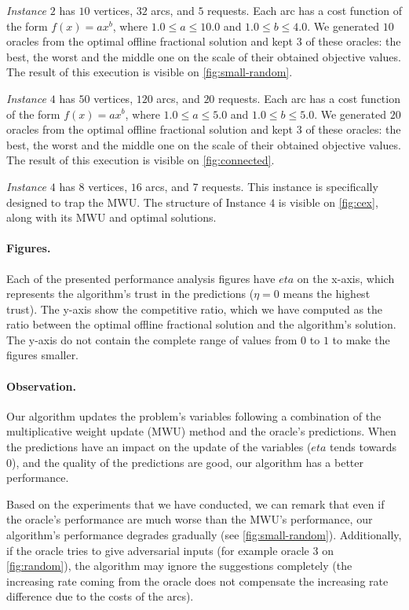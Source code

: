 \textit{Instance $2$} has $10$ vertices, $32$ arcs, and $5$ requests. Each arc has a cost function of the form $f(x) = a x^b$, where $1.0 \le a \le 10.0$ and $1.0 \le b \le 4.0$. We generated $10$ oracles from the optimal offline fractional solution and kept $3$ of these oracles: the best, the worst and the middle one on the scale of their obtained objective values. The result of this execution is visible on \cref{fig:small-random}.

\textit{Instance $4$} has $50$ vertices, $120$ arcs, and $20$ requests. Each arc has a cost function of the form $f(x) = a x^b$, where $1.0 \le a \le 5.0$ and $1.0 \le b \le 5.0$. We generated $20$ oracles from the optimal offline fractional solution and kept $3$ of these oracles: the best, the worst and the middle one on the scale of their obtained objective values. The result of this execution is visible on \cref{fig:connected}.

\textit{Instance $4$} has $8$ vertices, $16$ arcs, and $7$ requests. This instance is specifically designed to trap the MWU. The structure of Instance $4$ is visible on \cref{fig:cex}, along with its MWU and optimal solutions.


\paragraph{Figures.} Each of the presented performance analysis figures have $eta$ on the x-axis, which represents the algorithm's trust in the predictions ($\eta = 0$ means the highest trust). The y-axis show the competitive ratio, which we have computed as the ratio between the optimal offline fractional solution and the algorithm's solution. The y-axis do not contain the complete range of values from $0$ to $1$ to make the figures smaller.

\paragraph{Observation.} Our algorithm updates the problem's variables following a combination of the multiplicative weight update (MWU) method and the oracle's predictions. When the predictions have an impact on the update of the variables ($eta$ tends towards $0$), and the quality of the predictions are good, our algorithm has a better performance.

Based on the experiments that we have conducted, we can remark that even if the oracle's performance are much worse than the MWU's performance, our algorithm's performance degrades gradually (see \cref{fig:small-random}). Additionally, if the oracle tries to give adversarial inputs (for example oracle $3$ on \cref{fig:random}), the algorithm may ignore the suggestions completely (the increasing rate coming from the oracle does not compensate the increasing rate difference due to the costs of the arcs).

